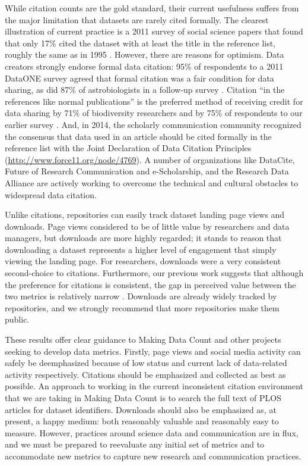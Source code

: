 \documentclass[english]{article}
\begin{document}

While citation counts are the gold standard, their current usefulness suffers from the major limitation that datasets are rarely cited formally.
The clearest illustration of current practice is a 2011 survey of social science papers that found that only 17\% cited the dataset with at least the title in the reference list, roughly the same as in 1995 \cite{sieber_not_1995, mooney_citing_2011}. 
However, there are reasons for optimism.
Data creators strongly endorse formal data citation: 95\% of respondents to a 2011 DataONE survey agreed that formal citation was a fair condition for data sharing, as did 87\% of astrobiologists in a follow-up survey \cite{tenopir_data_2011, aydinoglu_data_2014}. 
Citation ``in the references like normal publications'' is the preferred method of receiving credit for data sharing by 71\% of biodiversity researchers and by 75\% of respondents to our earlier survey \cite{enke_users_2012, kratz_researcher_2015}.
And, in 2014, the scholarly communication community recognized the consensus that data used in an article should be cited formally in the reference list with the Joint Declaration of Data Citation Principles (\url{http://www.force11.org/node/4769}).
A number of organizations like DataCite, Future of Research Communication and e-Scholarship, and the Research Data Alliance are actively working to overcome the technical and cultural obstacles to widespread data citation.

Unlike citations, repositories can easily track dataset landing page views and downloads.
Page views considered to be of little value by researchers and data managers, but downloads are more highly regarded; it stands to reason that downloading a dataset represents a higher level of engagement that simply viewing the landing page.
For researchers, downloads were a very consistent second-choice to citations.
Furthermore, our previous work suggests that although the preference for citations is consistent, the gap in perceived value between the two metrics is relatively narrow \cite{kratz_researcher_2015}.
Downloads are already widely tracked by repositories, and we strongly recommend that more repositories make them public.

These results offer clear guidance to Making Data Count and other projects seeking to develop data metrics.
Firstly, page views and social media activity can safely be deemphasized because of low status and current lack of data-related activity respectively.
Citations should be emphasized and collected as best as possible.
An approach to working in the current inconsistent citation environment that we are taking in Making Data Count is to search the full text of PLOS articles for dataset identifiers.
Downloads should also be emphasized as, at present, a happy medium: both reasonably valuable and reasonably easy to measure.
However, practices around science data and communication are in flux, and we must be prepared to reevaluate any initial set of metrics and to accommodate new metrics to capture new research and communication practices.
\end{document}

